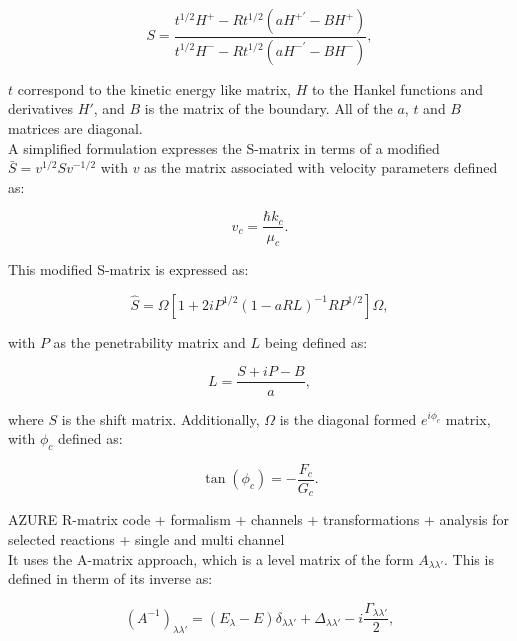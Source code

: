 \documentclass[openany]{book}
\begin{document}
 \begin{equation}\label{eq:numericalRmatrix_S}
	S = \frac{t^{1/2}H^{+} - Rt^{1/2}(aH^{+'} - BH^{+})}{t^{1/2}H^{-} - Rt^{1/2}(aH^{-'} - BH^{-})},
\end{equation}

$t$ correspond to the kinetic energy like matrix, $H$ to the Hankel functions and derivatives $H'$, and $B$ is the matrix of the boundary. All of the $a$, $t$ and $B$ matrices are diagonal. \\

A simplified formulation expresses the S-matrix in terms of a modified $\bar{S} = v^{1/2}Sv^{-1/2}$ with $v$ as the matrix associated with velocity parameters defined as: 

 \begin{equation}\label{eq:numericalRmatrix_v}
	v_c = \frac{\hbar k_c}{\mu_c}.
\end{equation}

This modified S-matrix is expressed as:

\begin{equation}\label{eq:numericalRmatrix_S_modified}
	\hat{S} = \Omega[1+ 2iP^{1/2}(1- aRL)^{-1}RP^{1/2}]\Omega,
\end{equation}

with $P$ as the penetrability matrix and $L$ being defined as:

\begin{equation}\label{eq:numericalRmatrix_L}
	L = \frac{S + iP - B}{a},
\end{equation}

where $S$ is the shift matrix. Additionally, $\Omega$ is the diagonal formed $e^{i\phi_c}$ matrix, with $\phi_c$ defined as: 

\begin{equation}\label{eq:numericalRmatrix_phi}
	\tan (\phi_c) = - \frac{F_c}{G_c}.
\end{equation}

 
\textsc{AZURE} R-matrix code + formalism + channels + transformations + analysis for selected reactions + single and multi channel 	\cite{azuma_uberseder_simpson_brune_costantini_deboer_gorres_heil_leblanc_ugalde_et_2010} \\

It uses the A-matrix approach, which is a level matrix of the form $A_{\lambda \lambda'}$. This is defined in therm of its inverse as: 

\begin{equation}\label{eq:numericalRmatrix_A}
	(A^{-1})_{\lambda \lambda'} = (E_\lambda - E)\delta_{\lambda\lambda'} + \Delta_{\lambda\lambda'} - i\frac{\Gamma_{\lambda\lambda'}}{2}, 
\end{equation}
\end{document}
